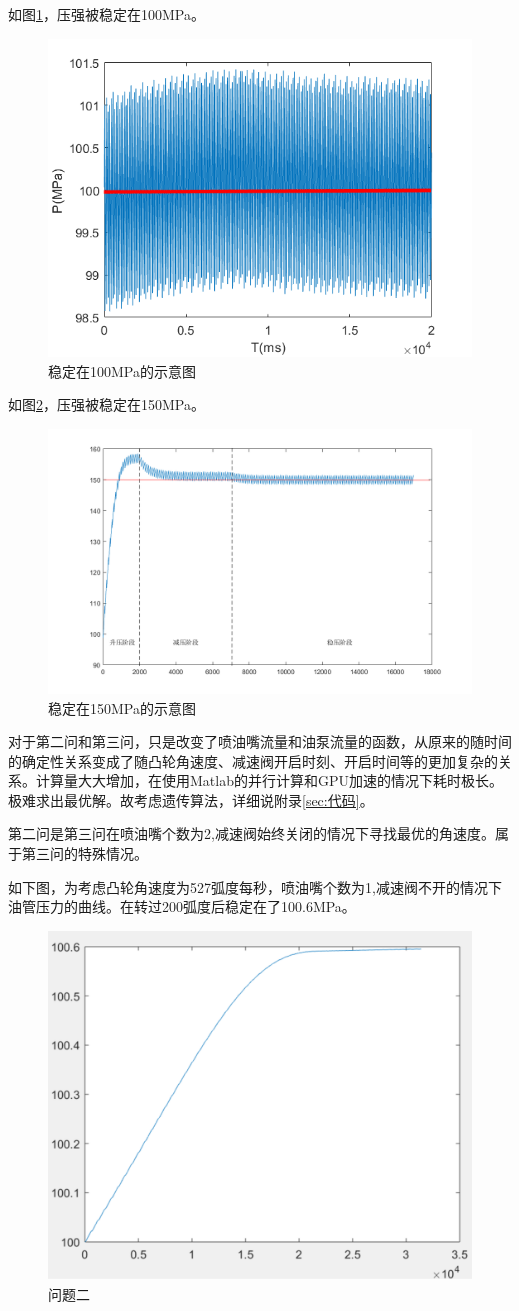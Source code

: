 \documentclass{article}
\begin{document}
如图\ref{fig:稳定在100MPa的示意图}，压强被稳定在100MPa。

\begin{figure}[H]
	\centering
	\includegraphics[width=0.6\linewidth]{1-7.png}
	\caption{稳定在100MPa的示意图}
	\label{fig:稳定在100MPa的示意图}
\end{figure}

如图\ref{fig:稳定在150MPa的示意图}，压强被稳定在150MPa。

\begin{figure}[H]
	\centering
	\includegraphics[width=0.6\linewidth]{1-8.png}
	\caption{稳定在150MPa的示意图}
	\label{fig:稳定在150MPa的示意图}
\end{figure}

对于第二问和第三问，只是改变了喷油嘴流量和油泵流量的函数，从原来的随时间的确定性关系变成了随凸轮角速度、减速阀开启时刻、开启时间等的更加复杂的关系。计算量大大增加，在使用Matlab的并行计算和GPU加速的情况下耗时极长。极难求出最优解。故考虑遗传算法，详细说附录\ref{sec:代码}。

第二问是第三问在喷油嘴个数为2,减速阀始终关闭的情况下寻找最优的角速度。属于第三问的特殊情况。

如下图，为考虑凸轮角速度为527弧度每秒，喷油嘴个数为1,减速阀不开的情况下油管压力的曲线。在转过200弧度后稳定在了100.6MPa。

\begin{figure}[H]
	\centering
	\includegraphics[width=0.5\linewidth]{0.png}
	\caption{问题二}
	\label{fig:问题二}
\end{figure}
\end{document}

